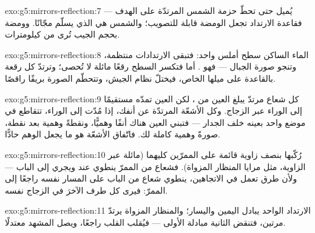 \begin{solution}{exo:g5:mirrors-reflection:7}
يُميل  حتى تحطّ حزمة الشمس المرتدّة على الهدف --- فقاعدة
الارتداد تجعل الومضة قابلة للتصويب؛ والشمس هي  الذي
يسلّم  مجّانًا. وومضة بحجم الجيب تُرى من كيلومترات.
\end{solution}

\begin{solution}{exo:g5:mirrors-reflection:8}
الماء الساكن سطح أملس واحد: فتبقى الارتدادات منتظمة، وتنجو صورة
الجبال --- فهو . أما  فتكسر السطح رقعًا مائلة لا تُحصى؛
وترتدّ كل رقعة بالقاعدة على ميلها الخاص، فيختلّ نظام الجيش،
وتتحطّم الصورة بريقًا راقصًا.
\end{solution}

\begin{solution}{exo:g5:mirrors-reflection:9}
كل شعاع مرتدّ يبلغ العين من ، لكن العين تمدّه مستقيمًا
إلى الوراء عبر الزجاج. وكل الأشعّة المرتدّة عن أنفك، إذا مُدّت
إلى الوراء، تتقاطع في موضع واحد بعينه خلف الجدار --- فتبني
العين هناك أنفًا وهميًّا، ونقطةً وهمية بعد نقطة، صورةً وهمية
كاملة لك. فاتّفاق الأشعّة هو ما يجعل الوهم حادًّا.
\end{solution}

\begin{solution}{exo:g5:mirrors-reflection:10}
رُكّبها بنصف زاوية قائمة على الممرّين كليهما (مائلة عبر
الزاوية، مثل مرايا المنظار المزواة). فشعاع من الممرّ ينطوي عند
 ويجري إلى الباب --- ولأن طرق  تعمل في الاتجاهين،
ينطوي شعاع من الباب على المسار نفسه راجعًا إلى الممرّ: فيرى كل
طرف الآخرَ في الزجاج نفسه.
\end{solution}

\begin{solution}{exo:g5:mirrors-reflection:11}
الارتداد الواحد يبادل اليمين واليسار؛ والمنظار المزواة يرتدّ
 مرتين، فتنقض  الثانية مبادلة  الأولى ---
فيُقلب القلب راجعًا، ويصل المشهد معتدلًا.
\end{solution}
